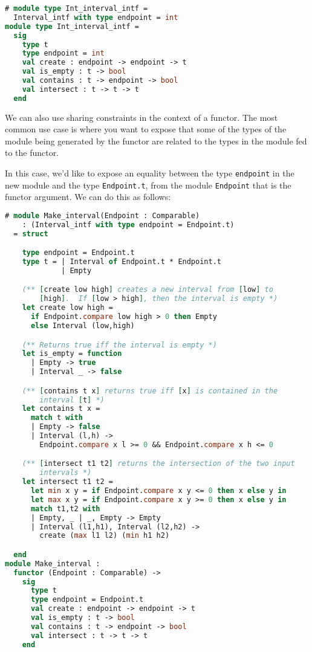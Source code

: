 \begin{lstlisting}[language=Caml]
# module type Int_interval_intf =
  Interval_intf with type endpoint = int
module type Int_interval_intf =
  sig
    type t
    type endpoint = int
    val create : endpoint -> endpoint -> t
    val is_empty : t -> bool
    val contains : t -> endpoint -> bool
    val intersect : t -> t -> t
  end
\end{lstlisting}

We can also use sharing constraints in the context of a functor. The
most common use case is where you want to expose that some of the types
of the module being generated by the functor are related to the types in
the module fed to the functor.

In this case, we'd like to expose an equality between the type
\passthrough{\lstinline!endpoint!} in the new module and the type
\passthrough{\lstinline!Endpoint.t!}, from the module
\passthrough{\lstinline!Endpoint!} that is the functor argument. We can
do this as follows:

\begin{lstlisting}[language=Caml]
# module Make_interval(Endpoint : Comparable)
    : (Interval_intf with type endpoint = Endpoint.t)
  = struct

    type endpoint = Endpoint.t
    type t = | Interval of Endpoint.t * Endpoint.t
             | Empty

    (** [create low high] creates a new interval from [low] to
        [high].  If [low > high], then the interval is empty *)
    let create low high =
      if Endpoint.compare low high > 0 then Empty
      else Interval (low,high)

    (** Returns true iff the interval is empty *)
    let is_empty = function
      | Empty -> true
      | Interval _ -> false

    (** [contains t x] returns true iff [x] is contained in the
        interval [t] *)
    let contains t x =
      match t with
      | Empty -> false
      | Interval (l,h) ->
        Endpoint.compare x l >= 0 && Endpoint.compare x h <= 0

    (** [intersect t1 t2] returns the intersection of the two input
        intervals *)
    let intersect t1 t2 =
      let min x y = if Endpoint.compare x y <= 0 then x else y in
      let max x y = if Endpoint.compare x y >= 0 then x else y in
      match t1,t2 with
      | Empty, _ | _, Empty -> Empty
      | Interval (l1,h1), Interval (l2,h2) ->
        create (max l1 l2) (min h1 h2)

  end
module Make_interval :
  functor (Endpoint : Comparable) ->
    sig
      type t
      type endpoint = Endpoint.t
      val create : endpoint -> endpoint -> t
      val is_empty : t -> bool
      val contains : t -> endpoint -> bool
      val intersect : t -> t -> t
    end
\end{lstlisting}

